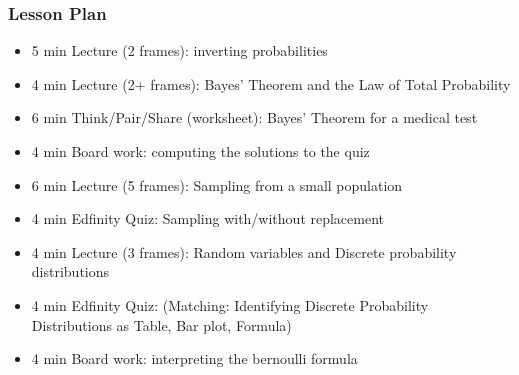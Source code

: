 \begin{frame}
    \frametitle{Lesson Plan}
    \begin{itemize}
        \item 5 min Lecture (2 frames): inverting probabilities
        \item 4 min Lecture (2+ frames): Bayes' Theorem and the Law of Total Probability
        \item 6 min Think/Pair/Share (worksheet): Bayes' Theorem for a medical test
        \item 4 min Board work: computing the solutions to the quiz

        \item 6 min Lecture (5 frames): Sampling from a small population
        \item 4 min Edfinity Quiz: Sampling with/without replacement
        \item 4 min Lecture (3 frames): Random variables and Discrete probability distributions
        \item 4 min Edfinity Quiz: (Matching: Identifying Discrete Probability Distributions as Table, Bar plot, Formula)
        \item 4 min Board work: interpreting the bernoulli formula
        
   \end{itemize}
\end{frame}


